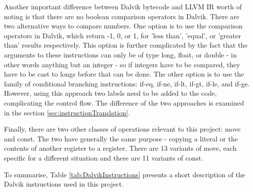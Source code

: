 \documentclass[parskip]{cs4rep}
\begin{document}
Another important difference between Dalvik bytecode and LLVM IR worth of noting is that there are no boolean comparison operators in Dalvik. There are two alternative ways to compare numbers. One option is to use the comparison operators in Dalvik, which return -1, 0, or 1, for 'less than', 'equal', or 'greater than' results respectively. This option is further complicated by the fact that the arguments to these instructions can only be of type long, float, or double - in other words anything but an integer - so if integers have to be compared, they have to be cast to longs before that can be done. The other option is to use the family of conditional branching instructions: if-eq, if-ne, if-lt, if-gt, if-le, and if-ge. However, using this approach two labels need to be added to the code, complicating the control flow. The difference of the two approaches is examined in the section \ref{sec:instructionTranslation}.

Finally, there are two other classes of operations relevant to this project: move and const. The two have generally the same purpose - copying a literal or the contents of another register to a register. There are 13 variants of move, each specific for a different situation and there are 11 variants of const.

To summarise, Table \ref{tab:DalvikInstructions} presents a short description of the Dalvik instructions used in this project. 
\end{document}
